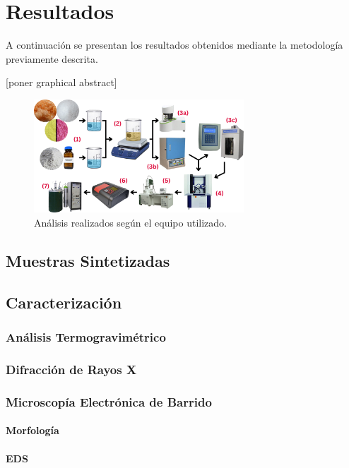 \documentclass[../main.tex]{subfiles}
\begin{document}
\chapter{Resultados}
A continuación se presentan los resultados obtenidos mediante la metodología previamente descrita. 

[poner graphical abstract]
\begin{figure}[H]
    \centering
    \includegraphics[width=0.7\textwidth]{fig/2.png}
    \caption{Análisis realizados según el equipo utilizado.}
    \label{fig:resdiag}
\end{figure}
\section{Muestras Sintetizadas}

\section{Caracterización}

\subsection{Análisis Termogravimétrico}

\subsection{Difracción de Rayos X}

\subsection{Microscopía Electrónica de Barrido}

\subsubsection{Morfología}

\subsubsection{EDS}
\end{document}
